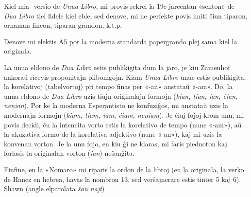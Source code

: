 %
%
\kolofono

\small Kiel mia \XeLaTeX{}-versio de \emph{Unua Libro}, mi provis rekrei la 19e-jarcentan «senton» de \emph{Dua Libro} tiel fidele kiel eble, sed denove, mi ne perfekte povis imiti ĉiun tiparon, ornaman lineon, tiparan grandon, k.t.p.

Denove mi elektis A5 por la moderna standarda papergrando plej sama kiel la originala.

La unua eldono de \emph{Dua Libro} estis publikigita dum la jaro, je kiu Zamenhof ankoraŭ ricevis proponitajn plibonigojn.  Kiam \emph{Unua Libro} unue estis publikigita, la korelativoj (tabelvortoj) pri tempo finas per «-an» anstataŭ «-am».  Do, la unua eldono de \emph{Dua Libro} uzis tiujn originalajn formojn (\emph{kian, tian, ian, ĉian, nenian}).  Por ke la moderna Esperantisto ne konfuziĝos, mi anstataŭ uzis la modernajn formojn (\emph{kiam, tiam, iam, ĉiam, neniam}).  Je ĉiuj fojoj krom unu, mi povis decidi, ĉu la intencita vorto estis la korelativo de tempo (nune «-am»), aŭ la akuzativa formo de la korelativa adjektivo (nune «-an»), kaj mi uzis la konvenan vorton.  Je la unu fojo, en kiu ĝi ne klaras, mi faris piednoton kaj forlasis la originalan vorton (\emph{ian}) neŝanĝita.

Finfine, en la «Nomaro» mi riparis la ordon de la libroj (en la originala, la verko de Hanez en hebrea,  havas la nombron 13, sed verŝajnerare estis tinter 5 kaj 6).\\[1ex] 

{\setlength{\parindent}{0em}
Shawn  (angle elparolata \emph{ŝan najt})\\
\hodiau}
